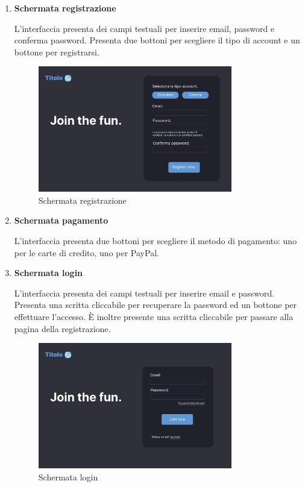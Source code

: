 \documentclass[a4paper,12pt]{article}
\begin{document}
\begin{enumerate}[label=\textbf{FE\arabic*}\;, ref=\textbf{FE\arabic*}]
    \item \label{itm:fe1} \textbf{Schermata registrazione}
    
    L'interfaccia presenta dei campi testuali per inserire email, password e conferma password. Presenta due bottoni per scegliere il tipo di account e un bottone per registrarsi.

    \begin{figure}[ht]
        \centering
        \includegraphics[width=0.8\textwidth]{schermata registrazione.png}
        \caption{Schermata registrazione}
        \label{fig:schermata_registrazione}
    \end{figure}

    \item \label{itm:fe2} \textbf{Schermata pagamento}
    
    L'interfaccia presenta due bottoni per scegliere il metodo di pagamento: uno per le carte di credito, uno per PayPal.
    \item \label{itm:fe3} \textbf{Schermata login}
    
    L'interfaccia presenta dei campi testuali per inserire email e password. Presenta una scritta cliccabile per recuperare la password ed un bottone per effettuare l'accesso. È inoltre presente una scritta cliccabile per passare alla pagina della registrazione.

    \begin{figure}[ht]
        \centering
        \includegraphics[width=0.8\textwidth]{schermata login.png}
        \caption{Schermata login}
        \label{fig:schermata_login}
    \end{figure}


\end{enumerate}
\end{document}
